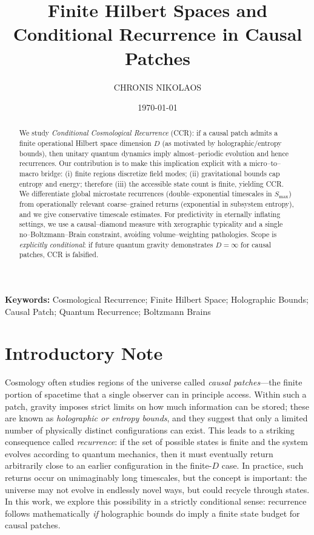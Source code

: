 \documentclass[12pt]{article}
\title{Finite Hilbert Spaces and Conditional Recurrence in Causal Patches}
\author{CHRONIS NIKOLAOS}
\affil[1]{Department of Computer Science \& Engineering, University of Crete}
\date{\today}
\newcommand{\Smax}{S_{\max}}
\theoremstyle{remark}
\begin{document}
\maketitle

\begin{abstract}
We study \emph{Conditional Cosmological Recurrence} (CCR): if a causal patch admits a finite operational Hilbert space dimension $D$ (as motivated by holographic/entropy bounds), then unitary quantum dynamics imply almost–periodic evolution and hence recurrences. 
Our contribution is to make this implication explicit with a micro–to–macro bridge: (i) finite regions discretize field modes; (ii) gravitational bounds cap entropy and energy; therefore (iii) the accessible state count is finite, yielding CCR. 
We differentiate global microstate recurrences (double–exponential timescales in $\Smax$) from operationally relevant coarse–grained returns (exponential in subsystem entropy), and we give conservative timescale estimates. 
For predictivity in eternally inflating settings, we use a causal–diamond measure with xerographic typicality and a single no–Boltzmann–Brain constraint, avoiding volume–weighting pathologies. 
Scope is \emph{explicitly conditional}: if future quantum gravity demonstrates $D=\infty$ for causal patches, CCR is falsified.
\end{abstract}


\noindent\textbf{Keywords:} 
Cosmological Recurrence; Finite Hilbert Space; Holographic Bounds; 
Causal Patch; Quantum Recurrence; Boltzmann Brains


\section*{Introductory Note}

Cosmology often studies regions of the universe called \emph{causal patches}---the finite
portion of spacetime that a single observer can in principle access. Within such a patch,
gravity imposes strict limits on how much information can be stored; these are known as
\emph{holographic or entropy bounds}, and they suggest that only a limited number of
physically distinct configurations can exist. This leads to a striking consequence called
\emph{recurrence}: if the set of possible states is finite and the system evolves according to
quantum mechanics, then it must eventually return arbitrarily close to an earlier
configuration in the finite-$D$ case. In practice, such returns occur on unimaginably long timescales, but the
concept is important: the universe may not evolve in endlessly novel ways, but could recycle
through states. In this work, we explore this possibility in a strictly conditional sense:
recurrence follows mathematically \emph{if} holographic bounds do imply a finite state
budget for causal patches.
\end{document}
